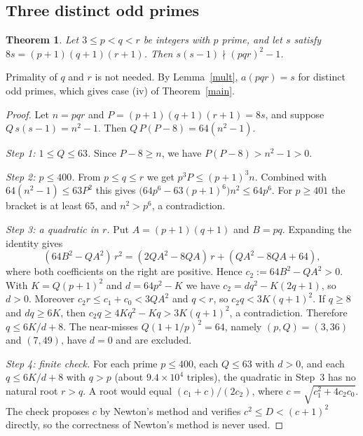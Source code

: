 \documentclass[11pt]{article}
\newtheorem{theorem}{Theorem}
\theoremstyle{remark}\newtheorem{remark}[theorem]{Remark}
\begin{document}
\subsection{Three distinct odd primes}
\begin{theorem}\label{pqr}
Let $3\le p<q<r$ be integers with $p$ prime, and let $s$ satisfy $8s=(p+1)(q+1)(r+1)$. Then $s(s-1)\nmid (pqr)^2-1$.
\end{theorem}
Primality of $q$ and $r$ is not needed. By Lemma~\ref{mult}, $a(pqr)=s$ for distinct odd primes, which gives case (iv) of Theorem~\ref{main}.
\begin{proof}
Let $n=pqr$ and $P=(p+1)(q+1)(r+1)=8s$, and suppose $Q\,s(s-1)=n^2-1$. Then $Q\,P(P-8)=64(n^2-1)$.

\emph{Step 1: $1\le Q\le 63$.} Since $P-8\ge n$, we have $P(P-8)>n^2-1>0$.

\emph{Step 2: $p\le 400$.} From $p\le q\le r$ we get $p^3P\le (p+1)^3n$. Combined with $64(n^2-1)\le 63P^2$ this gives $\bigl(64p^6-63(p+1)^6\bigr)n^2\le 64p^6$. For $p\ge 401$ the bracket is at least $65$, and $n^2>p^6$, a contradiction.

\emph{Step 3: a quadratic in $r$.} Put $A=(p+1)(q+1)$ and $B=pq$. Expanding the identity gives
\[(64B^2-QA^2)\,r^2=(2QA^2-8QA)\,r+(QA^2-8QA+64),\]
where both coefficients on the right are positive. Hence $c_2:=64B^2-QA^2>0$. With $K=Q(p+1)^2$ and $d=64p^2-K$ we have $c_2=dq^2-K(2q+1)$, so $d>0$. Moreover $c_2r\le c_1+c_0<3QA^2$ and $q<r$, so $c_2q<3K(q+1)^2$. If $q\ge 8$ and $dq\ge 6K$, then $c_2q\ge 4Kq^2-Kq>3K(q+1)^2$, a contradiction. Therefore $q\le 6K/d+8$. The near-misses $Q(1+1/p)^2=64$, namely $(p,Q)=(3,36)$ and $(7,49)$, have $d=0$ and are excluded.

\emph{Step 4: finite check.} For each prime $p\le 400$, each $Q\le 63$ with $d>0$, and each $q\le 6K/d+8$ with $q>p$ (about $9.4\times10^4$ triples), the quadratic in Step~3 has no natural root $r>q$. A root would equal $(c_1+c)/(2c_2)$, where $c=\sqrt{c_1^2+4c_2c_0}$. The check proposes $c$ by Newton's method and verifies $c^2\le D<(c+1)^2$ directly, so the correctness of Newton's method is never used.
\end{proof}
\end{document}
